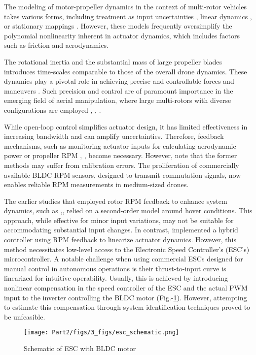 \par The modeling of motor-propeller dynamics in the context of multi-rotor
vehicles takes various forms, including treatment as input uncertainties \cite{liang2021geometric}, linear dynamics \cite{pounds2010modelling}, or stationary mappings \cite{tayebi2006attitude}. However, these models frequently oversimplify the polynomial nonlinearity inherent in actuator dynamics, which includes factors such as friction and aerodynamics.

The rotational inertia and the substantial mass of large propeller blades
introduces time-scales comparable to those of the overall drone dynamics. These
dynamics play a pivotal role in achieving precise and controllable forces and
maneuvers \cite{hamandi2021design}. Such precision and control are of
paramount importance in the emerging field of aerial manipulation, where large
multi-rotors with diverse configurations are employed \cite{ding2021design},
\cite{ryll20176d}, \cite{jiang2017estimation}.

While open-loop control simplifies actuator design, it has limited
effectiveness in increasing bandwidth \cite{charla2022enhancing} and can
amplify uncertainties. Therefore, feedback mechanisms, such as monitoring
actuator inputs for calculating aerodynamic power \cite{B_Manony} or propeller
RPM \cite{franchi2017adaptive}, \cite{bangura2017thrust}, become necessary.
However, note that the former methods may suffer from calibration errors. The
proliferation of commercially available BLDC RPM sensors, designed to transmit
commutation signals, now enables reliable RPM measurements in medium-sized
drones.

The earlier studies that employed rotor RPM feedback to enhance system
dynamics, such as
\cite{pounds2009design},\cite{pounds2007system},\cite{mahony2012multirotor}
relied on a second-order model around hover conditions. This approach, while
effective for minor input variations, may not be suitable for accommodating
substantial input changes. In contrast, \cite{franchi2017adaptive} implemented
a hybrid controller using RPM feedback to linearize actuator dynamics. However,
this method necessitates low-level access to the Electronic Speed Controller's
(ESC's) microcontroller. A notable challenge when using commercial ESCs designed for manual control in autonomous operations
is their thrust-to-input curve is linearized for intuitive
operability. Usually, this is achieved by introducing nonlinear compensation in
the speed controller of the ESC and the actual PWM input to the inverter
controlling the BLDC motor (Fig.-\ref{fig::bldc_diag}). However, attempting to
estimate this compensation through system identification techniques proved to
be unfeasible.
\begin{figure}[h]
    \centering
    \texttt{[image: Part2/figs/3\_figs/esc\_schematic.png]}
    \caption{Schematic of ESC with BLDC motor}
    \label{fig::bldc_diag}
\end{figure}


